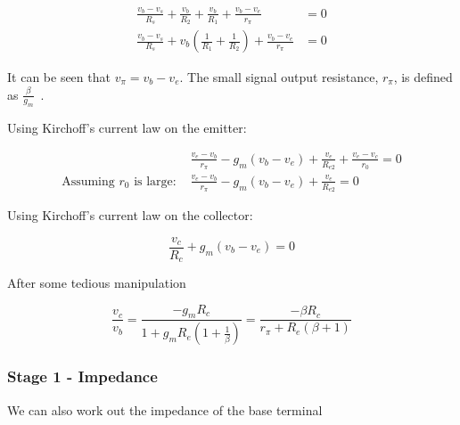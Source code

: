 \documentclass[a4paper,11pt]{article}
\begin{document}
            \begin{subequations}
            \begin{align}
                \frac{v_b - v_s}{R_s} + \frac{v_b}{R_2} + \frac{v_b}{R_1} + \frac{v_b - v_e}{r_\pi} &= 0\\
                \frac{v_b - v_s}{R_s} + v_b \left(\frac{1}{R_1} + \frac{1}{R_2} \right) + \frac{v_b - v_e}{r_\pi} &= 0 \label{eq:kclBase}
            \end{align}
            \end{subequations}

            It can be seen that $v_\pi = v_b - v_e$. The small signal output resistance, $r_\pi$, is defined as $\frac{\beta}{g_m}$~\cite[p. 29]{ADAIC}.

            Using Kirchoff's current law on the emitter:

            \begin{subequations}
            \begin{align}
                &\frac{v_e - v_b}{r_\pi} - g_m (v_b - v_e) + \frac{v_e}{R_{e2}} + \frac{v_e - v_c}{r_0} = 0\\
                \textrm{Assuming $r_0$ is large: } &\frac{v_e - v_b}{r_\pi} - g_m (v_b - v_e) + \frac{v_e}{R_{e2}} = 0 \label{eq:kclEmitter}
            \end{align}
            \end{subequations}

            Using Kirchoff's current law on the collector:

            \begin{equation} \label{eq:kclCollector}
                \frac{v_c}{R_c} + g_m(v_b - v_e) = 0
            \end{equation}

            After some tedious manipulation
            
            \begin{equation} \label{eq:s1gain}
                \frac{v_c}{v_b} = \frac{-g_m R_c}{1 + g_m R_e \left( 1+ \frac{1}{\beta} \right) }
                                = \frac{-\beta R_c}{r_{\pi} + R_e (\beta + 1)}
            \end{equation}
            
            \subsubsection{Stage 1 - Impedance}
                
            We can also work out the impedance of the base terminal
            
\end{document}
